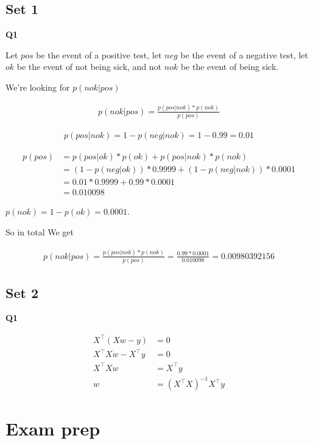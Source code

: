 \documentclass{article}
\begin{document}
	\subsection{Set 1}
	
		\textbf{Q1}
		
			Let $pos$ be the event of a positive test, let $neg$ be the event of a negative test, let $ok$ be the event of not being sick, and not $nok$ be the event of being sick.
			
			We're looking for $p(nok|pos)$
			
			\begin{align}
				p(nok|pos) = \frac{p(pos|nok)*p(nok)}{p(pos)}
			\end{align}
			
			\begin{align}
				p(pos|nok) = 1 - p(neg|nok) = 1-0.99 = 0.01
			\end{align}
			
			\begin{align}
				p(pos) &= p(pos|ok)*p(ok) + p(pos|nok)*p(nok)\\
				&= (1-p(neg|ok))*0.9999 + (1-p(neg|nok))*0.0001\\
				&= 0.01*0.9999 + 0.99*0.0001\\
				&= 0.010098
			\end{align}
			
			$p(nok) = 1-p(ok) = 0.0001$.
			
			So in total We get
			
			\begin{align}
				p(nok|pos) = \frac{p(pos|nok)*p(nok)}{p(pos)} = \frac{0.99*0.0001}{0.010098} = 0.00980392156
			\end{align}
			
	\subsection{Set 2}
	
		\textbf{Q1}
		
			\begin{align}
				X^\top(Xw - y) &= 0\\
				X^\top Xw - X^\top y &= 0\\
				X^\top Xw  &= X^\top y\\
				w  &= (X^\top X)^{-1}X^\top y
			\end{align}
			
\section{Exam prep}
\end{document}
